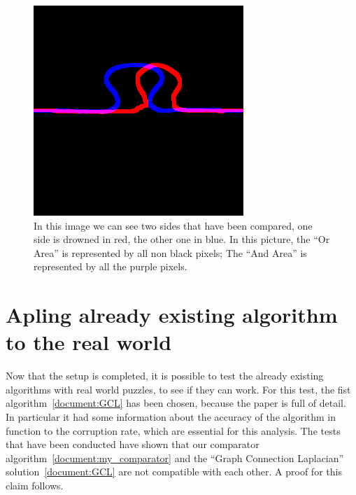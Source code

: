 \documentclass{article}
\begin{document}
\begin{figure}[htbp]
  \centering
  \begin{minipage}[t]{0.44\textwidth}
    \vspace{3pt} %
    \includegraphics[width=\textwidth]{pictures/side_comparation.png}
  \end{minipage}
  \hfill
  \begin{minipage}[t]{0.54\textwidth}
    \caption{\newline
    In this image we can see two sides that have been
    compared, one side is drowned in red, the other one in blue.
    In this picture, the “Or Area” is represented by all non
    black pixels; The “And Area” is represented by all the
    purple pixels.}
  \end{minipage}
\end{figure}
\clearpage

\section{Apling already existing algorithm to the real world}
Now that the setup is completed, it is possible to test the already existing
algorithms with real world puzzles, to see if they can work. For this test,
the fist algorithm~\ref{document:GCL} has been chosen, because the paper is full of detail.
In particular it had some information about the accuracy of the algorithm in
function to the corruption rate, which are essential for this analysis.
\newline \newline
The tests that have been conducted have shown that our comparator algorithm~\ref{document:my_comparator}
and the “Graph Connection Laplacian” solution~\ref{document:GCL} are not compatible with each other.
A proof for this claim follows.
\end{document}
